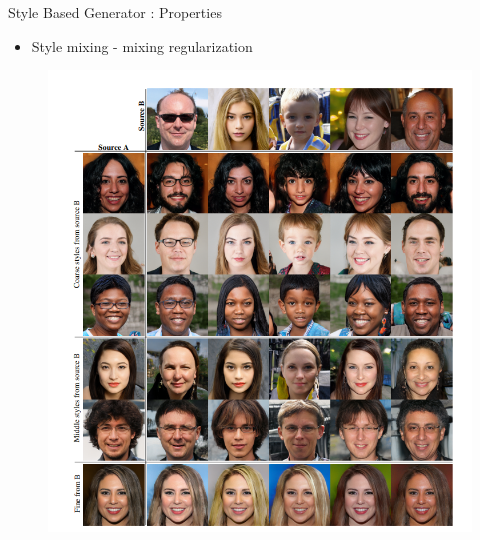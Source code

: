 \documentclass[10pt]{beamer}
\begin{document}
\begin{frame}[fragile]{Style Based Generator : Properties }
        \begin{itemize}
        \item Style mixing - mixing regularization
    \end{itemize}
    \begin{figure}[ht]
         \hspace*{-1cm}\includegraphics[width=0.6\linewidth]{stylemixing.png} \\ \\ \\ \\ \\
    \end{figure}

\end{frame}
\end{document}
